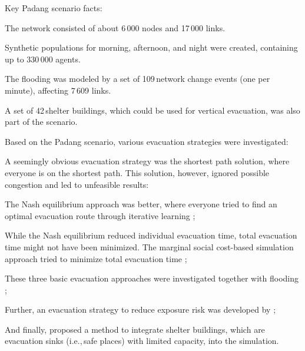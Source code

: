 Key Padang scenario facts:
\begin{compactitem}
\item The network consisted of about 6\,000 nodes and 17\,000 links.
\item Synthetic populations for morning, afternoon, and night were created, containing up to 330\,000 agents.
\item The flooding was modeled by a set of 109\,network change events (one per minute), affecting 7\,609 links.
\item A set of 42\,shelter buildings, which could be used for vertical evacuation, was also part of the scenario.
\end{compactitem}
Based on the Padang scenario, various evacuation strategies were investigated:
\begin{compactitem}
\item A seemingly obvious evacuation strategy was the shortest path solution, where everyone is on the shortest path. This solution, however, ignored possible congestion and led to unfeasible results:
\item The Nash equilibrium approach was better, where everyone tried to find an optimal evacuation route through iterative learning \citep{00LaemmelKluepfelNagel2009EvacPadangAtBookTimmermanns};
\item While the Nash equilibrium reduced individual evacuation time, total evacuation time might not have been minimized. The marginal social cost-based simulation approach tried to minimize total evacuation time \citep{00LaemmelFloetteroed2009KISysOptEvac,00DresslerFloetteroedLaemmelNagelSkutella2010OptimalEvacuationLargeScaleScenarios};
\item These three basic evacuation approaches were investigated together with flooding \citep{00LaemmelGretherNagel2009TimeDependentNetworks,Laemmel_PhDThesis_2011};
\item Further, an evacuation strategy to reduce exposure risk was developed by \citep{00LaemmelKluepfelNagel2010PEDRiskPrinted};
\item And finally, \citet{00FloetteroedLaemmel2010ICECShelterEvac} proposed a method to integrate shelter buildings, which are evacuation sinks (i.e.,\,safe places) 
with limited capacity, into the simulation.  
\end{compactitem}

